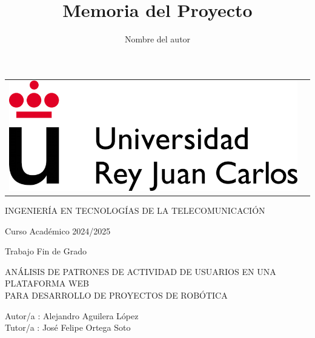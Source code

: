 \documentclass[a4paper, 12pt]{book}
\title{Memoria del Proyecto}
\author{Nombre del autor}
\begin{document}
 


\begin{titlepage}
\begin{center}
\begin{tabular}[c]{c c}
\includegraphics[scale=1.5]{img/LogoURJC.png}
\\
\end{tabular}

\vspace{3cm}

\Large 
INGENIERÍA EN TECNOLOGÍAS DE LA TELECOMUNICACIÓN

\vspace{0.4cm}

\large
Curso Académico 2024/2025

\vspace{0.8cm}

Trabajo Fin de Grado

\vspace{2cm}

\LARGE ANÁLISIS DE PATRONES DE ACTIVIDAD DE USUARIOS EN UNA PLATAFORMA WEB \\
PARA DESARROLLO DE PROYECTOS DE ROBÓTICA
\vspace{3cm}

\large
Autor/a : Alejandro Aguilera López \\
Tutor/a : José Felipe Ortega Soto
\end{center}
\end{titlepage}
\end{document}
